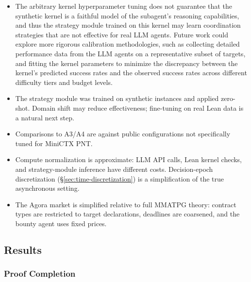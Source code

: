 \begin{itemize}
    \item The arbitrary kernel hyperparameter tuning does not guarantee that the synthetic kernel is a faithful model of the subagent’s reasoning capabilities, and thus the strategy module trained on this kernel may learn coordination strategies that are not effective for real LLM agents. Future work could explore more rigorous calibration methodologies, such as collecting detailed performance data from the LLM agents on a representative subset of targets, and fitting the kernel parameters to minimize the discrepancy between the kernel’s predicted success rates and the observed success rates across different difficulty tiers and budget levels.
    \item The strategy module was trained on synthetic instances and applied zero-shot. Domain shift may reduce effectiveness; fine-tuning on real Lean data is a natural next step.
    \item Comparisons to A3/A4 are against public configurations not specifically tuned for MiniCTX PNT.
    \item Compute normalization is approximate: LLM API calls, Lean kernel checks, and strategy-module inference have different costs. Decision-epoch discretization (\S\ref{sec:time-discretization}) is a simplification of the true asynchronous setting.
    \item The Agora market is simplified relative to full MMATPG theory: contract types are restricted to target declarations, deadlines are coarsened, and the bounty agent uses fixed prices.
\end{itemize}


\subsection{Results}\label{sec:app-results}

\subsubsection{Proof Completion}\label{sec:proof-completion}

